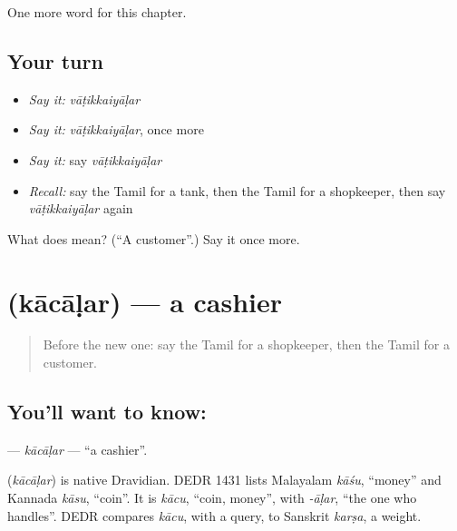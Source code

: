 \begin{grammarlens}[title={What you've built}]
One more word for this chapter.
\end{grammarlens}

\subsection*{Your turn}
\begin{itemize}
\raggedright
  \item \emph{Say it:} \emph{vāṭikkaiyāḷar}
  \item \emph{Say it:} \emph{vāṭikkaiyāḷar}, once more
  \item \emph{Say it:} say \emph{vāṭikkaiyāḷar}
  \item \emph{Recall:} say the Tamil for a tank, then the Tamil for a shopkeeper, then say \emph{vāṭikkaiyāḷar} again
\end{itemize}

\begin{tcolorbox}[breakable,colback=teal!4,colframe=teal!35!black,title={Before you move on}]
What does  mean? (\textquotedblleft{}A customer\textquotedblright{}.) Say it once more.
\end{tcolorbox}
\section[\texorpdfstring{\ta{காசாளர்} (kācāḷar)}{காசாளர் (kācāḷar)}]{ (kācāḷar) — a cashier}

\label{lesson:TA-C191-kacalar}



\begin{quote}
Before the new one: say the Tamil for a shopkeeper, then the Tamil for a customer.
\end{quote}

\subsection*{You'll want to know: }
\textbf{} — \emph{kācāḷar} — \textquotedblleft{}a cashier\textquotedblright{}.

\begin{cousinweb}
\textbf{} (\emph{kācāḷar}) is native Dravidian. DEDR 1431 lists Malayalam \emph{kāśu}, \textquotedblleft{}money\textquotedblright{} and Kannada \emph{kāsu}, \textquotedblleft{}coin\textquotedblright{}. It is \emph{kācu}, \textquotedblleft{}coin, money\textquotedblright{}, with \emph{-āḷar}, \textquotedblleft{}the one who handles\textquotedblright{}. DEDR compares \emph{kācu}, with a query, to Sanskrit \emph{karṣa}, a weight.
\end{cousinweb}

